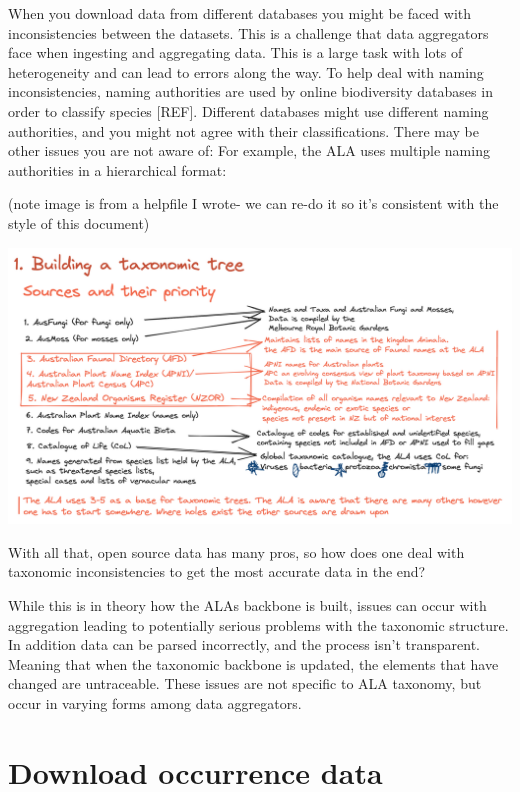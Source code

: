 \documentclass[
  letterpaper,
  DIV=11,
  numbers=noendperiod,
  oneside]{scrreprt}
\begin{document}
When you download data from different databases you might be faced with
inconsistencies between the datasets. This is a challenge that data
aggregators face when ingesting and aggregating data. This is a large
task with lots of heterogeneity and can lead to errors along the way. To
help deal with naming inconsistencies, naming authorities are used by
online biodiversity databases in order to classify species {[}REF{]}.
Different databases might use different naming authorities, and you
might not agree with their classifications. There may be other issues
you are not aware of: For example, the ALA uses multiple naming
authorities in a hierarchical format:

(note image is from a helpfile I wrote- we can re-do it so it's
consistent with the style of this document)

\includegraphics{images/image-1066364510.png}

With all that, open source data has many pros, so how does one deal with
taxonomic inconsistencies to get the most accurate data in the end?

While this is in theory how the ALAs backbone is built, issues can occur
with aggregation leading to potentially serious problems with the
taxonomic structure. In addition data can be parsed incorrectly, and the
process isn't transparent. Meaning that when the taxonomic backbone is
updated, the elements that have changed are untraceable. These issues
are not specific to ALA taxonomy, but occur in varying forms among data
aggregators.


\hypertarget{sec-download-data}{%
\chapter{Download occurrence data}\label{sec-download-data}}
\end{document}
